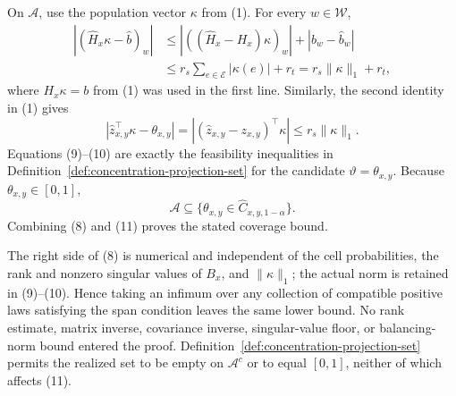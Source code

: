 On \(\mathcal A\), use the population vector \(\kappa\) from (1). For every \(w\in\mathcal W\),
\[
\begin{aligned}
| (\widehat H_x\kappa-\widehat b)_w |
&\le |((\widehat H_x-H_x)\kappa)_w|+|b_w-\widehat b_w|\\
&\le r_s\sum_{e\in\mathcal E}|\kappa(e)|+r_t
=r_s\lVert\kappa\rVert_1+r_t,
\end{aligned}
\tag{9}
\]
where \(H_x\kappa=b\) from (1) was used in the first line. Similarly, the second identity in (1) gives
\[
|\widehat z_{x,y}^{\top}\kappa-\theta_{x,y}|
=| (\widehat z_{x,y}-z_{x,y})^{\top}\kappa |
\le r_s\lVert\kappa\rVert_1.
\tag{10}
\]
Equations (9)--(10) are exactly the feasibility inequalities in Definition~\ref{def:concentration-projection-set} for the candidate \(\vartheta=\theta_{x,y}\). Because \(\theta_{x,y}\in[0,1]\),
\[
\mathcal A\subseteq
\{\theta_{x,y}\in\widehat C_{x,y,1-\alpha}\}.
\tag{11}
\]
Combining (8) and (11) proves the stated coverage bound.

The right side of (8) is numerical and independent of the cell probabilities, the rank and nonzero singular values of \(B_x\), and \(\lVert\kappa\rVert_1\); the actual norm is retained in (9)--(10). Hence taking an infimum over any collection of compatible positive laws satisfying the span condition leaves the same lower bound. No rank estimate, matrix inverse, covariance inverse, singular-value floor, or balancing-norm bound entered the proof. Definition~\ref{def:concentration-projection-set} permits the realized set to be empty on \(\mathcal A^c\) or to equal \([0,1]\), neither of which affects (11).